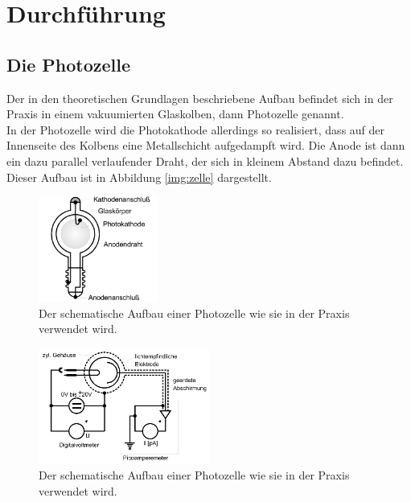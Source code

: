\section{Durchführung}

    \subsection{Die Photozelle}
    Der in den theoretischen Grundlagen beschriebene Aufbau befindet sich in der Praxis in einem vakuumierten Glaskolben, dann Photozelle genannt.\\
    In der Photozelle wird die Photokathode allerdings so realisiert, dass auf der Innenseite des Kolbens eine Metallschicht aufgedampft wird.
    Die Anode ist dann ein dazu parallel verlaufender Draht, der sich in kleinem Abstand dazu befindet.\\
    Dieser Aufbau ist in Abbildung \ref{img:zelle} dargestellt.
    

    \begin{figure}[H]
        \centering
        \includegraphics[width=0.35\textwidth]{latex/images/Photozelle.PNG}
        \caption{Der schematische Aufbau einer Photozelle wie sie in der Praxis verwendet wird\protect \cite{500}.}
        \label{img:schem}
    \end{figure}
    
    \begin{figure}[h]
        \centering
        \includegraphics[width=0.5\textwidth]{latex/images/Schaltbild.PNG}
        \caption{Der schematische Aufbau einer Photozelle wie sie in der Praxis verwendet wird\protect \cite{500}.}
        \label{img:schem}
    \end{figure}

